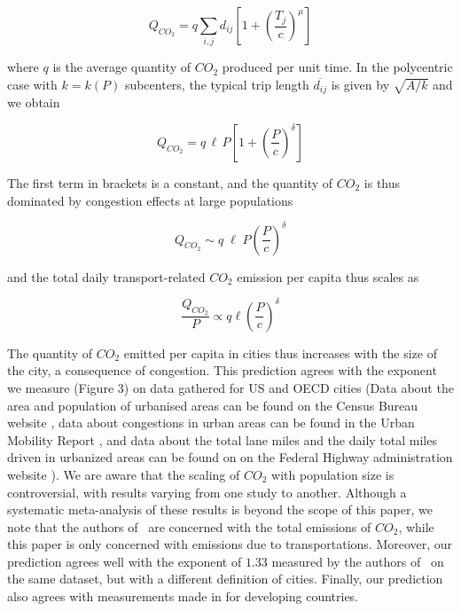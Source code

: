 \begin{equation}
    Q_{CO_2}  = q \sum_{i,j} d_{ij} \left[ 1+ \left( \frac{T_j}{c} \right)^\mu \right]
\end{equation}

where $q$ is the average quantity of $CO_2$ produced per unit time. In the
polycentric case with $k=k(P)$ subcenters, the typical trip length
$\overline{d_{ij}}$ is given by $\sqrt{A/k}$ and we obtain

\begin{equation}
    Q_{CO_2} = q\, \ell\, P \left[ 1 + \left(\frac{P}{c}\right)^{\delta} \right]
\end{equation}

The first term in brackets is a constant, and the quantity of $CO_2$ is thus
dominated by congestion effects at large populations

\begin{equation}
    Q_{CO_2} \sim q\; \ell\; P \left(\frac{P}{c}\right)^{\delta}
\end{equation}

and the total daily transport-related $CO_2$ emission per capita thus scales as 

\begin{equation}
    \frac{Q_{CO_2}}{P} \propto  q\ell \left(\frac{P}{c}\right)^{\delta}
\end{equation}

The quantity of $CO_2$ emitted per capita in cities thus increases with the size
of the city, a consequence of congestion. This prediction agrees with the
exponent we measure (Figure 3) on data gathered for US and OECD cities (Data
about the area and population of urbanised areas can be found  on the Census
Bureau website \cite{DataUSA1}, data about congestions in urban areas can be
found in the Urban Mobility Report \cite{DataUSA2}, and data about the total
lane miles and the daily total miles driven in urbanized areas can be found on
on the Federal Highway administration website \cite{DataUSA3}). We are aware
that the scaling of $CO_2$ with population size is controversial, with results
varying from one study to another. Although a systematic meta-analysis of these
results is beyond the scope of this paper, we note that the authors
of~\cite{Fragkias:2013} are concerned with the total emissions of $CO_2$, while
this paper is only concerned with emissions due to transportations. Moreover,
our prediction agrees well with the exponent of $1.33$ measured by the authors
of~\cite{Oliveira:2014} on the same dataset, but with a different definition of
cities. Finally, our prediction also agrees with measurements made in
\cite{Rybski} for developing countries. 

